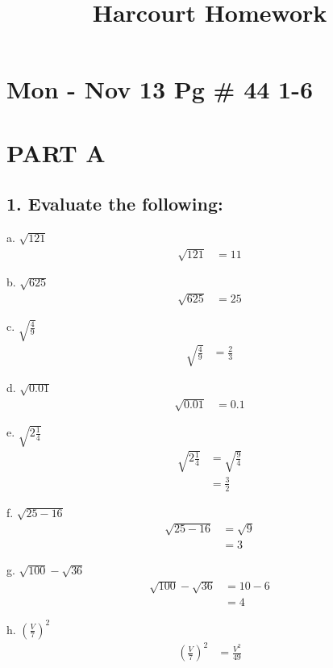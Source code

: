 \documentclass{article}
\begin{document}
\title{Harcourt Homework}
\maketitle
\section*{Mon - Nov 13 Pg \# 44 1-6}
\section*{PART A}

\subsection*{1. Evaluate the following:}

a. $\sqrt{121}$
\begin{align*}
    \sqrt{121} 
    &= 11
\end{align*}

b. $\sqrt{625}$
\begin{align*}
    \sqrt{625} &= 25
\end{align*}

c. $\sqrt{\frac{4}{9}}$
\begin{align*}
    \sqrt{\frac{4}{9}} &= \frac{2}{3}
\end{align*}

d. $\sqrt{0.01}$
\begin{align*}
    \sqrt{0.01} &= 0.1
\end{align*}

e. $\sqrt{2 \frac{1}{4}}$
\begin{align*}
    \sqrt{2 \frac{1}{4}} &= \sqrt{\frac{9}{4}} \\
    &= \frac{3}{2}
\end{align*}

f. $\sqrt{25-16}$
\begin{align*}
    \sqrt{25-16} &= \sqrt{9} \\
    &= 3
\end{align*}

g. $\sqrt{100}-\sqrt{36}$
\begin{align*}
    \sqrt{100}-\sqrt{36} &= 10 - 6 \\
    &= 4
\end{align*}

h. $(\frac{V}{7})^2$
\begin{align*}
    \left(\frac{V}{7}\right)^2 &= \frac{V^2}{49}
\end{align*}
\end{document}

